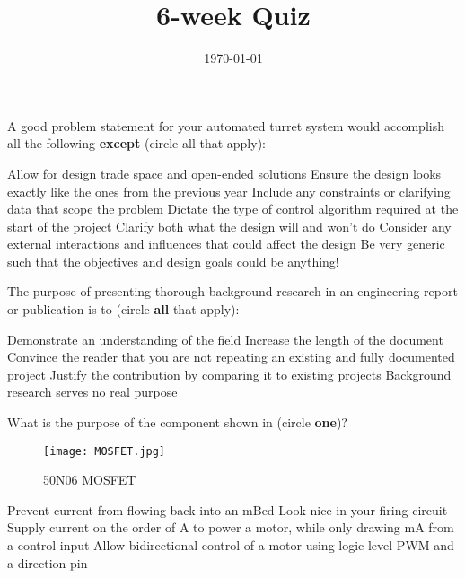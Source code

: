 \documentclass[addpoints,answers]{exam}
\title{6-week Quiz}
\author{\usnaInstructorShort}
\date{\today}
\begin{document}
\maketitle

\begin{questions}
\question
A good problem statement for your automated turret system would accomplish all the following {\bf except} (circle all that apply):
\begin{choices}
\CorrectChoice Allow for design trade space and open-ended solutions
\choice Ensure the design looks exactly like the ones from the previous year  
\CorrectChoice Include any constraints or clarifying data that scope the problem
\choice Dictate the type of control algorithm required at the start of the project
\CorrectChoice Clarify both what the design will and won't do 
\CorrectChoice Consider any external interactions and influences that could affect the design
\choice Be very generic such that the objectives and design goals could be anything!
\end{choices}





\question
The purpose of presenting thorough background research in an engineering report or publication is to (circle {\bf all} that apply):
\begin{choices}
\CorrectChoice Demonstrate an understanding of the field
\choice Increase the length of the document 
\CorrectChoice Convince the reader that you are not repeating an existing and fully documented project
\CorrectChoice Justify the contribution by comparing it to existing projects
\choice Background research serves no real purpose
\end{choices}




\question
What is the purpose of the component shown in  (circle {\bf one})?
\begin{figure}[h]
\centering
	\texttt{[image: MOSFET.jpg]}
	\caption{50N06 MOSFET}
	\label{fig:MOSFET}
\end{figure}

\begin{choices}
\choice Prevent current from flowing back into an mBed
\choice Look nice in your firing circuit
\CorrectChoice Supply current on the order of \si{\ampere} to power a motor, while only drawing \si{\milli\ampere} from a control input
\choice Allow bidirectional control of a motor using logic level PWM and a direction pin
\end{choices}






\end{questions}
\end{document}
